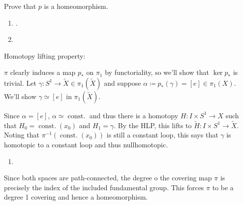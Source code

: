 Prove that \(p\) is a homeomorphism.


\begin{solution}

\hfill

\begin{concept}

\hfill

\end{concept}

\begin{enumerate}
\def\labelenumi{\alph{enumi}.}
\item
  .
\item
\end{enumerate}

Homotopy lifting property:

\begin{center}
\end{center}

\(\pi\) clearly induces a map \(p_*\) on \(\pi_1\) by functoriality, so
we'll show that \(\ker p_*\) is trivial. Let
\(\gamma: S^1 \to \tilde X \in \pi_1(\tilde X)\) and suppose
\(\alpha \coloneqq p_*(\gamma) = [e] \in \pi_1(X)\). We'll show
\(\gamma \simeq[e]\) in \(\pi_1(\tilde X)\).

Since \(\alpha = [e]\), \(\alpha \simeq{\operatorname{const.}}\) and
thus there is a homotopy \(H: I\times S^1 \to X\) such that
\(H_0 = {\operatorname{const.}}(x_0)\) and \(H_1 = \gamma\). By the HLP,
this lifts to \(\tilde H: I\times S^1 \to \tilde X\). Noting that
\(\pi^{-1}({\operatorname{const.}}(x_0))\) is still a constant loop,
this says that \(\gamma\) is homotopic to a constant loop and thus
nullhomotopic.

\begin{enumerate}
\def\labelenumi{\alph{enumi}.}
\setcounter{enumi}{2}
\tightlist
\item
\end{enumerate}

Since both spaces are path-connected, the degree o the covering map
\(\pi\) is precisely the index of the included fundamental group. This
forces \(\pi\) to be a degree 1 covering and hence a homeomorphism.

\end{solution}

